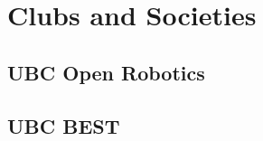 \documentclass[]{aftab-resume}
\begin{document}
\begin{minipage}[t]{0.33\textwidth}
\vspace{0.75cm}


\section{Clubs and Societies} 
\vspace{0.15cm}

\subsection{UBC Open Robotics}
\vspace{0.175cm}
\subsection{UBC BEST}
\sectionsep

%
%

\end{minipage} 
\hfill
\end{document}
